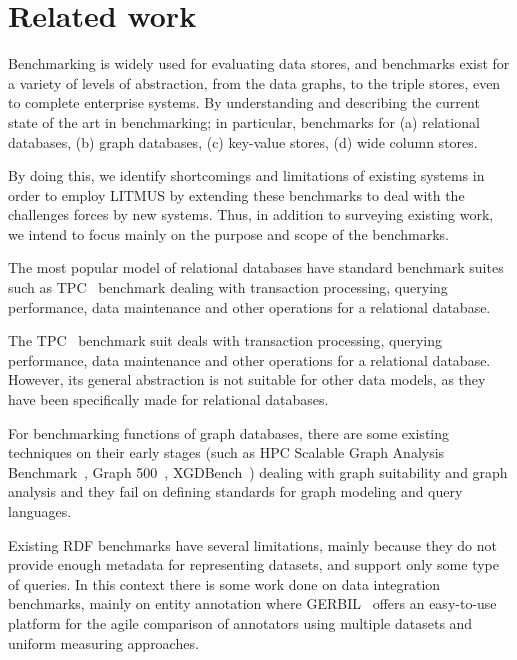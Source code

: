 \documentclass{llncs}
\begin{document}
\section{Related work}\label{relwork}

    Benchmarking is widely used for evaluating data stores, and benchmarks exist for a variety of levels of abstraction, from the data graphs, to the triple stores, even to complete enterprise systems.
    By understanding and describing the current state of the art in benchmarking; in particular, benchmarks for (a) relational databases, (b) graph databases, (c) key-value stores, (d) wide column stores.
    
    By doing this, we identify shortcomings and limitations of existing systems in order to employ LITMUS by extending these benchmarks to deal with the challenges forces by new systems.
    Thus, in addition to surveying existing work, we intend to focus mainly on the purpose and scope of the benchmarks.
    
    The most popular model of relational databases have standard benchmark suites such as TPC~\cite{Nambiar2011} benchmark dealing with transaction processing, querying performance, data maintenance and other operations for a relational database.
    
    The TPC~\cite{Nambiar2011} benchmark suit deals with transaction processing, querying performance, data maintenance and other operations for a relational database.
    However, its general abstraction is not suitable for other data models, as they have been specifically made for relational databases.
    
    For benchmarking functions of graph databases, there are some existing techniques on their early stages (such as HPC Scalable Graph Analysis Benchmark~\cite{Dominguez-Sal:2010:SGD:1927585.1927590}, Graph 500~\cite{murphy2010introducing}, XGDBench~\cite{conf/cloudcom/DayarathnaS12}) dealing with graph suitability and graph analysis and they fail on defining standards for graph modeling and query languages.
    
    Existing RDF benchmarks have several limitations, mainly because they do not provide enough metadata for representing datasets, and support only some type of queries.
    In this context there is some work done on data integration benchmarks, mainly on entity annotation where GERBIL~\cite{Usbeck:2015:GGE:2736277.2741626} offers an easy-to-use platform for the agile comparison of annotators using multiple datasets and uniform measuring approaches.
    
\end{document}
